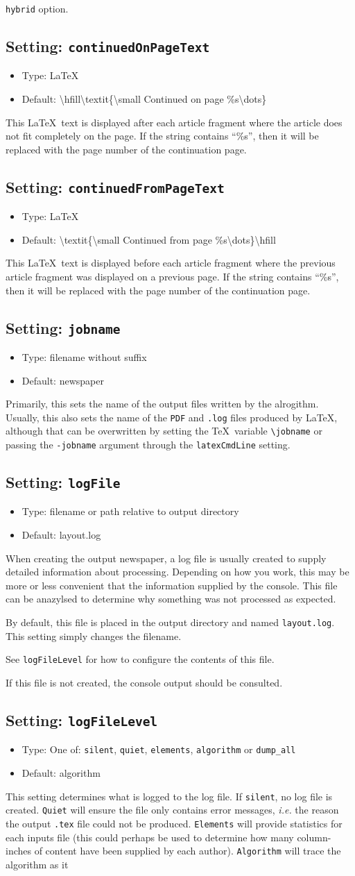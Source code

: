 \documentclass[a4paper,DIV=11]{scrartcl}
\newcommand{\property}[5]{
  \subsection{#1: \texttt{#2}}
  \begin{itemize}
  \item Type: #3
  \item Default: #4
  \end{itemize}
  #5
}
\newcommand{\setting}{\property{Setting}}
\begin{document}
\begin{multicols}{2}
{{      \texttt{hybrid} option.}
}
\setting{continuedOnPageText}{\LaTeX}{\textbackslash hfill\textbackslash textit\{\textbackslash small Continued
    on page \%s\textbackslash dots\}}{
  This \LaTeX\ text is displayed after each article fragment where the
  article does not fit completely on the page. If the string contains
  ``\%s'', then it will be replaced with the page number of the
  continuation page.
}
\setting{continuedFromPageText}{\LaTeX}{\textbackslash textit\{\textbackslash small Continued
  from page \%s\textbackslash dots\}\textbackslash hfill}{
  This \LaTeX\ text is displayed before each article fragment where the
  previous article fragment was displayed on a previous page. If the
  string contains ``\%s'', then it will be replaced with the page
  number of the continuation page.
}
\setting{jobname}{filename without suffix}{newspaper}{Primarily, this
  sets the name of the output files written by the alrogithm. Usually,
  this also sets the name of the \texttt{PDF} and \texttt{.log} files
  produced by \LaTeX, although that can be overwritten by setting the
  \TeX\ variable \texttt{\textbackslash jobname} or passing the
  \texttt{-jobname} argument through the \texttt{latexCmdLine}
  setting.}
\setting{logFile}{filename or path relative to output directory}{layout.log}{
  When creating the output newspaper, a log file is usually created to
  supply detailed information about processing. Depending on how you
  work, this may be more or less convenient that the information
  supplied by the console. This file can be anazylsed to determine why
  something was not processed as expected.\par By default, this file
  is placed in the output directory and named
  \texttt{layout.log}. This setting simply changes the filename.\par
  See \texttt{logFileLevel} for how to configure the contents of this
  file.\par If this file is not created, the console output should be consulted.
}
\setting{logFileLevel}{One of: \texttt{silent}, \texttt{quiet}, \texttt{elements},
  \texttt{algorithm} or \texttt{dump\_all}}{algorithm}{
  This setting determines what is logged to the log file. If
  \texttt{silent}, no log file is created. \texttt{Quiet} will ensure
  the file only contains error messages, \textit{i.e.} the reason the
  output \texttt{.tex} file could not be produced. \texttt{Elements}
  will provide statistics for each inputs file (this could perhaps be used to
  determine how many column-inches of content have been supplied by
  each author). \texttt{Algorithm} will trace the algorithm as it
}
\end{multicols}
\end{document}
